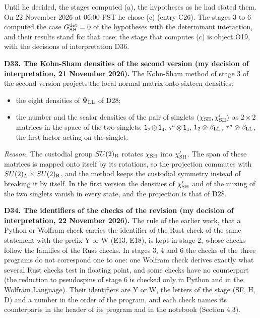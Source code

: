\documentclass[
  10pt,
]{article}
\providecommand{\tightlist}{%
  \setlength{\itemsep}{0pt}\setlength{\parskip}{0pt}}
\begin{document}
Until he decided, the stages computed (a), the hypotheses as he had
stated them. On 22 November 2026 at 06:00 PST he chose (c) (entry C26).
The stages 3 to 6 computed the case \(G^{\rm det}_{\rm SH}=0\) of the
hypotheses with the determinant interaction, and their results stand for
that case; the stage that computes (c) is object O19, with the decisions
of interpretation D36.

\textbf{D33. The Kohn-Sham densities of the second version (my decision
of interpretation, 21 November 2026).} The Kohn-Sham method of stage 3
of the second version projects the local normal matrix onto sixteen
densities:

\begin{itemize}
\tightlist
\item
  the eight densities of \(\Psi_{\rm LL}\) of D28;
\item
  the number and the scalar densities of the pair of singlets
  \((\chi_{\rm SH},\chi'_{\rm SH})\) as \(2\times2\) matrices in the
  space of the two singlets: \(\mathsf 1_2\otimes\mathsf 1_4\),
  \(\tau^a\otimes\mathsf 1_4\), \(\mathsf 1_2\otimes\beta_{\rm LL}\),
  \(\tau^a\otimes\beta_{\rm LL}\), the first factor acting on the
  singlet.
\end{itemize}

\emph{Reason.} The custodial group \(SU(2)_{\rm R}\) rotates
\(\chi_{\rm SH}\) into \(\chi'_{\rm SH}\). The span of these matrices is
mapped onto itself by its rotations, so the projection commutes with
\(SU(2)_L\times SU(2)_{\rm R}\), and the method keeps the custodial
symmetry instead of breaking it by itself. In the first version the
densities of \(\chi'_{\rm SH}\) and of the mixing of the two singlets
vanish in every state, and the projection is that of D28.

\textbf{D34. The identifiers of the checks of the revision (my decision
of interpretation, 22 November 2026).} The rule of the earlier work,
that a Python or Wolfram check carries the identifier of the Rust check
of the same statement with the prefix Y or W (E13, E18), is kept in
stage 2, whose checks follow the families of the Rust checks. In stages
3, 4 and 6 the checks of the three programs do not correspond one to
one: one Wolfram check derives exactly what several Rust checks test in
floating point, and some checks have no counterpart (the reduction to
pseudospins of stage 6 is checked only in Python and in the Wolfram
Language). Their identifiers are Y or W, the letters of the stage (SF,
H, D) and a number in the order of the program, and each check names its
counterparts in the header of its program and in the notebook (Section
4.3).
\end{document}
